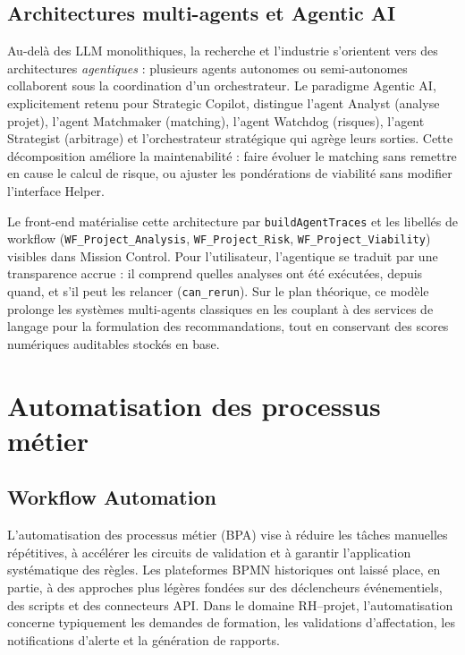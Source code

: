 \subsection{Architectures multi-agents et Agentic AI}

Au-delà des LLM monolithiques, la recherche et l'industrie s'orientent vers des architectures \emph{agentiques} : plusieurs agents autonomes ou semi-autonomes collaborent sous la coordination d'un orchestrateur. Le paradigme Agentic AI, explicitement retenu pour Strategic Copilot, distingue l'agent Analyst (analyse projet), l'agent Matchmaker (matching), l'agent Watchdog (risques), l'agent Strategist (arbitrage) et l'orchestrateur stratégique qui agrège leurs sorties. Cette décomposition améliore la maintenabilité : faire évoluer le matching sans remettre en cause le calcul de risque, ou ajuster les pondérations de viabilité sans modifier l'interface Helper.

Le front-end matérialise cette architecture par \texttt{buildAgentTraces} et les libellés de workflow (\texttt{WF\_Project\_Analysis}, \texttt{WF\_Project\_Risk}, \texttt{WF\_Project\_Viability}) visibles dans Mission Control. Pour l'utilisateur, l'agentique se traduit par une transparence accrue : il comprend quelles analyses ont été exécutées, depuis quand, et s'il peut les relancer (\texttt{can\_rerun}). Sur le plan théorique, ce modèle prolonge les systèmes multi-agents classiques en les couplant à des services de langage pour la formulation des recommandations, tout en conservant des scores numériques auditables stockés en base.

\section{Automatisation des processus métier}

\subsection{Workflow Automation}

L'automatisation des processus métier (BPA) vise à réduire les tâches manuelles répétitives, à accélérer les circuits de validation et à garantir l'application systématique des règles. Les plateformes BPMN historiques ont laissé place, en partie, à des approches plus légères fondées sur des déclencheurs événementiels, des scripts et des connecteurs API. Dans le domaine RH--projet, l'automatisation concerne typiquement les demandes de formation, les validations d'affectation, les notifications d'alerte et la génération de rapports.

